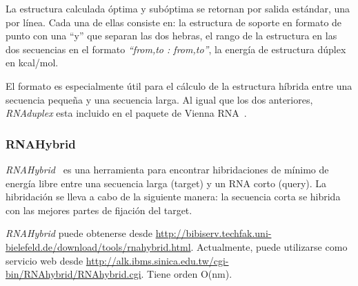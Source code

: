 \par La estructura calculada óptima y subóptima se retornan por salida estándar, una por línea. Cada una de ellas consiste en: la estructura de soporte en formato de punto con una ``y'' que separan las dos hebras, el rango de la estructura en las dos secuencias en el formato \emph{``from,to : from,to''}, la energía de estructura dúplex en kcal/mol.

\par El formato es especialmente útil para el cálculo de la estructura híbrida entre una secuencia pequeña y una secuencia larga. Al igual que los dos anteriores, \emph{RNAduplex} esta incluido en el paquete de Vienna RNA~\cite{vienna}.         

\subsubsection{RNAHybrid}
\par \emph{RNAHybrid~\cite{rnahybrid}} es una herramienta para encontrar hibridaciones de mínimo de energía libre entre una
secuencia larga (target) y un RNA corto (query). La hibridación se lleva a cabo de la siguiente manera: la secuencia corta se hibrida con las mejores partes de fijación del target.

\par \emph{RNAHybrid} puede obtenerse desde \url{http://bibiserv.techfak.uni-bielefeld.de/download/tools/rnahybrid.html}.  Actualmente, puede utilizarse como servicio web desde \url{http://alk.ibms.sinica.edu.tw/cgi-bin/RNAhybrid/RNAhybrid.cgi}.
Tiene orden O(nm).
